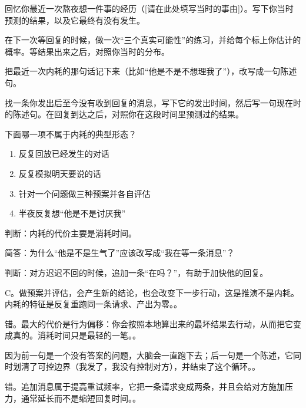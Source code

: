 \begin{exercisessec}
\item 回忆你最近一次熬夜想一件事的经历（[请在此处填写当时的事由]）。写下你当时预测的结果，以及它最终有没有发生。

\item 在下一次等回复的时候，做一次“三个真实可能性”的练习，并给每个标上你估计的概率。等结果出来之后，对照你当时的分布。

\item 把最近一次内耗的那句话记下来（比如“他是不是不想理我了”），改写成一句陈述句。

\item 找一条你发出后至今没有收到回复的消息，写下它的发出时间，然后写一句现在时的陈述句。在回复到达之后，对照你在这段时间里预测过的结果。
\end{exercisessec}

\begin{quizsec}
\item 下面哪一项不属于内耗的典型形态？

\begin{enumerate}[label=\Alph*., leftmargin=2.2em, labelsep=0.6em,
                  itemsep=0.2em, topsep=0.3em, parsep=0.1em]
\item 反复回放已经发生的对话
\item 反复模拟明天要说的话
\item 针对一个问题做三种预案并各自评估
\item 半夜反复想“他是不是讨厌我”
\end{enumerate}

\item 判断：内耗的代价主要是消耗时间。

\item 简答：为什么“他是不是生气了”应该改写成“我在等一条消息”？

\item 判断：对方迟迟不回的时候，追加一条“在吗？”，有助于加快他的回复。
\end{quizsec}

\begin{answerssec}
\item C。做预案并评估，会产生新的结论，也会改变下一步行动，这是推演不是内耗。内耗的特征是反复重跑同一条请求、产出为零。。

\item 错。最大的代价是行为偏移：你会按照本地算出来的最坏结果去行动，从而把它变成真的。消耗时间只是最轻的一笔。。

\item 因为前一句是一个没有答案的问题，大脑会一直跑下去；后一句是一个陈述，它同时划清了可控边界（我发了，我没有控制对方），并结束了这个循环。。

\item 错。追加消息属于提高重试频率，它把一条请求变成两条，并且会给对方施加压力，通常延长而不是缩短回复时间。。
\end{answerssec}

